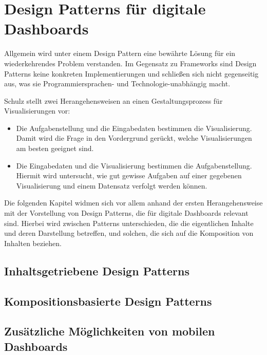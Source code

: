 \newpage


\section{Design Patterns für digitale Dashboards}\label{sec:design-patterns-list}

Allgemein wird unter einem Design Pattern eine bewährte Lösung für ein wiederkehrendes Problem verstanden.
Im Gegensatz zu Frameworks sind Design Patterns keine konkreten Implementierungen und schließen sich nicht gegenseitig aus, was sie Programmiersprachen- und Technologie-unabhängig macht.

Schulz \autocite{Schulz.DesignSpaceVisualizationTasks.2013} stellt zwei Herangehensweisen an einen Gestaltungsprozess für Visualisierungen vor:

\begin{itemize}
    \item Die Aufgabenstellung und die Eingabedaten bestimmen die Visualisierung.
    Damit wird die Frage in den Vordergrund gerückt, welche Visualisierungen am besten geeignet sind.
    \item Die Eingabedaten und die Visualisierung bestimmen die Aufgabenstellung.
    Hiermit wird untersucht, wie gut gewisse Aufgaben auf einer gegebenen Visualisierung und einem Datensatz verfolgt werden können.
\end{itemize}

Die folgenden Kapitel widmen sich vor allem anhand der ersten Herangehensweise mit der Vorstellung von Design Patterns, die für digitale Dashboards relevant sind.
Hierbei wird zwischen Patterns unterschieden, die die eigentlichen Inhalte und deren Darstellung betreffen, und solchen, die sich auf die Komposition von Inhalten beziehen.

\subsection{Inhaltsgetriebene Design Patterns}\label{subsec:content-design-patterns}

\subsection{Kompositionsbasierte Design Patterns}\label{subsec:conposition-design-patterns}

\subsection{Zusätzliche Möglichkeiten von mobilen Dashboards}\label{subsec:zusatzliche-moglichkeiten-von-mobilen-dashboards}

